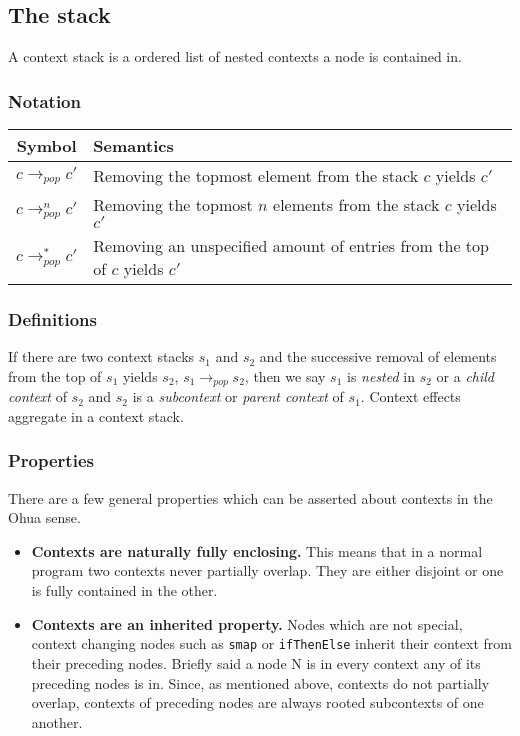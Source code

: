 \subsection{The stack}

A context stack is a ordered list of nested contexts a node is contained in.

\subsubsection{Notation}

\begin{tabular}{c | l}
  Symbol & Semantics \\ \hline
  $c \rightarrow_{pop} c'$ & Removing the topmost element from the stack $c$ yields $c'$ \\
  $c \rightarrow_{pop}^n c'$ & Removing the topmost $n$ elements from the stack $c$ yields $c'$ \\
  $c \rightarrow_{pop}^* c'$ & Removing an unspecified amount of entries from the top of $c$ yields $c'$ \\
\end{tabular}

\subsubsection{Definitions}

If there are two context stacks $s_1$ and $s_2$ and the successive removal of elements from the top of $s_1$ yields $s_2$, $s_1 \rightarrow_{pop} s_2$, then we say $s_1$ is \textit{nested} in $s_2$ or a \emph{child context} of $s_2$ and $s_2$ is a \textit{subcontext} or \emph{parent context} of $s_1$.
Context effects aggregate in a context stack.


\subsubsection{Properties}

There are a few general properties which can be asserted about contexts in the Ohua sense.

\begin{itemize}
  \item \textbf{Contexts are naturally fully enclosing.}
        This means that in a normal program two contexts never partially overlap.
        They are either disjoint or one is fully contained in the other.
  \item \textbf{Contexts are an inherited property.}
        Nodes which are not special, context changing nodes such as \texttt{smap} or \texttt{ifThenElse} inherit their context from their preceding nodes.
        Briefly said a node N is in every context any of its preceding nodes is in.
        Since, as mentioned above, contexts do not partially overlap, contexts of preceding nodes are always rooted subcontexts of one another.
\end{itemize}

